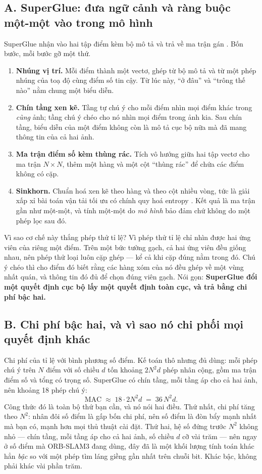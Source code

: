 \documentclass[../../deep_learning.tex]{subfiles}
\begin{document}
\subsection{A. SuperGlue: đưa ngữ cảnh và ràng buộc một-một vào trong mô hình}
SuperGlue nhận vào hai tập điểm kèm bộ mô tả và trả về ma trận gán \cite{sarlin2020superglue}. Bốn bước, mỗi bước gỡ một thứ.

\begin{enumerate}
\item \textbf{Nhúng vị trí.} Mỗi điểm thành một vectơ, ghép từ bộ mô tả và từ một phép nhúng của toạ độ cùng điểm số tin cậy. Từ lúc này, ``ở đâu'' và ``trông thế nào'' nằm chung một biểu diễn.
\item \textbf{Chín tầng  xen kẽ.} Tầng tự chú ý cho mỗi điểm nhìn mọi điểm khác trong \emph{cùng} ảnh; tầng chú ý chéo cho nó nhìn mọi điểm trong ảnh kia. Sau chín tầng, biểu diễn của một điểm không còn là mô tả cục bộ nữa mà đã mang thông tin của cả hai ảnh.
\item \textbf{Ma trận điểm số kèm thùng rác.} Tích vô hướng giữa hai tập vectơ cho ma trận \(N \times N\), thêm một hàng và một cột ``thùng rác'' để chứa các điểm không có cặp.
\item \textbf{Sinkhorn.} Chuẩn hoá xen kẽ theo hàng và theo cột nhiều vòng, tức là giải xấp xỉ bài toán vận tải tối ưu có chính quy hoá entropy \cite{cuturi2013sinkhorn}. Kết quả là ma trận gần như một-một, và tính một-một do \emph{mô hình} bảo đảm chứ không do một phép lọc sau đó.
\end{enumerate}

Vì sao cơ chế này thắng phép thử tỉ lệ? Vì phép thử tỉ lệ chỉ nhìn được hai ứng viên của riêng một điểm. Trên một bức tường gạch, cả hai ứng viên đều giống nhau, nên phép thử loại luôn cặp ghép --- kể cả khi cặp đúng nằm trong đó. Chú ý chéo thì cho điểm đó biết rằng các hàng xóm của nó đều ghép về một vùng nhất quán, và thông tin đó đủ để chọn đúng viên gạch. Nói gọn: \textbf{SuperGlue đổi một quyết định cục bộ lấy một quyết định toàn cục, và trả bằng chi phí bậc hai.}

\subsection{B. Chi phí bậc hai, và vì sao nó chi phối mọi quyết định khác}
Chi phí của  tỉ lệ với bình phương số điểm. Kế toán thô nhưng đủ dùng: mỗi phép chú ý trên \(N\) điểm với số chiều \(d\) tốn khoảng \(2N^2 d\) phép nhân cộng, gồm ma trận điểm số và tổng có trọng số. SuperGlue có chín tầng, mỗi tầng áp cho cả hai ảnh, nên khoảng 18 phép chú ý:
\[
\text{MAC} \;\approx\; 18 \cdot 2 N^2 d \;=\; 36\,N^2 d .
\]
Công thức đó là toàn bộ thứ bạn cần, và nó nói hai điều. Thứ nhất, chi phí tăng theo \(N^2\): nhân đôi số điểm là gấp bốn chi phí, nên số điểm là đòn bẩy mạnh nhất mà bạn có, mạnh hơn mọi thủ thuật cài đặt. Thứ hai, hệ số đứng trước \(N^2\) không nhỏ --- chín tầng, mỗi tầng áp cho cả hai ảnh, số chiều \(d\) cỡ vài trăm --- nên ngay ở số điểm mà ORB-SLAM3 đang dùng, đây đã là một khối lượng tính toán khác hẳn \emph{bậc} so với một phép tìm láng giềng gần nhất trên chuỗi bit. Khác bậc, không phải khác vài phần trăm.
\end{document}
